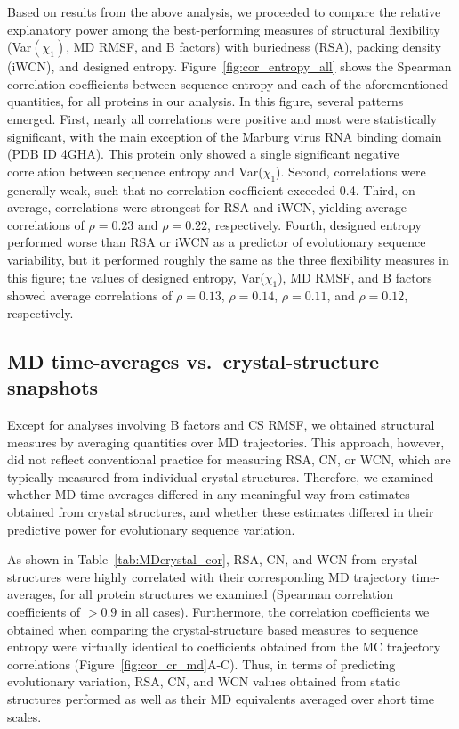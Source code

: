\documentclass[smallextended]{svjour3}
\begin{document}
Based on results from the above analysis, we proceeded to compare the relative explanatory power among the best-performing measures of structural flexibility (Var$(\chi_1)$, MD RMSF, and B factors) with buriedness (RSA), packing density (iWCN), and designed entropy. Figure~\ref{fig:cor_entropy_all} shows the Spearman correlation coefficients between sequence entropy and each of the aforementioned quantities, for all proteins in our analysis. In this figure, several patterns emerged. First, nearly all correlations were positive and most were statistically significant, with the main exception of the Marburg virus RNA binding domain (PDB ID 4GHA). This protein only showed a single significant negative correlation between sequence entropy and Var($\chi_1$). Second, correlations were generally weak, such that no correlation coefficient exceeded 0.4. Third, on average, correlations were strongest for RSA and iWCN, yielding average correlations of $\rho=0.23$ and $\rho=0.22$, respectively. Fourth, designed entropy performed worse than RSA or iWCN as a predictor of evolutionary sequence variability, but it performed roughly the same as the three flexibility measures in this figure; the values of designed entropy, Var($\chi_1$), MD RMSF, and B factors showed average correlations of $\rho=0.13$, $\rho=0.14$, $\rho=0.11$, and $\rho=0.12$, respectively.


\subsection*{MD time-averages vs.\ crystal-structure snapshots}

Except for analyses involving B factors and CS RMSF, we obtained structural measures by averaging quantities over MD trajectories. This approach, however, did not reflect conventional practice for measuring RSA, CN, or WCN, which are typically measured from individual crystal structures. Therefore, we examined whether MD time-averages differed in any meaningful way from estimates obtained from crystal structures, and whether these estimates differed in their predictive power for evolutionary sequence variation.

As shown in Table~\ref{tab:MDcrystal_cor}, RSA, CN, and WCN from crystal structures were highly correlated with their corresponding MD trajectory time-averages, for all protein structures we examined (Spearman correlation coefficients of $>0.9$ in all cases). Furthermore, the correlation coefficients we obtained when comparing the crystal-structure based measures to sequence entropy were virtually identical to coefficients obtained from the MC trajectory correlations (Figure~\ref{fig:cor_cr_md}A-C). Thus, in terms of predicting evolutionary variation, RSA, CN, and WCN values obtained from static structures performed as well as their MD equivalents averaged over short time scales. 
\end{document}
